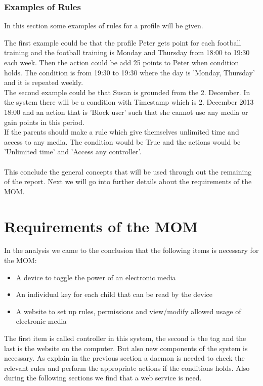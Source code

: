 \subsubsection{Examples of Rules}
In this section some examples of rules for a profile will be given.

The first example could be that the profile Peter gets point for each football training and the football training is Monday and Thursday from 18:00 to 19:30 each week. Then the action could be add 25 points to Peter when condition holds. The condition is from 19:30 to 19:30 where the day is 'Monday, Thursday' and it is repeated weekly. \\

The second example could be that Susan is grounded from the 2. December. In the system there will be a condition with Timestamp which is 2. December 2013 18:00
and an action that is 'Block user' such that she cannot use any media or gain points in this period. \\

If the parents should make a rule which give themselves unlimited time and access to any media. The condition would be True and the actions would be 'Unlimited time' and 'Access any controller'.\\\\

This conclude the general concepts that will be used through out the remaining of the report. Next we will go into further details about the requirements of the MOM.  


\section{Requirements of the MOM}
\label{sec:RequirMOM}

In the analysis we came to the conclusion that the following items is necessary for the MOM: 
\begin{itemize}
	\item A device to toggle the power of an electronic media
	\item An individual key for each child that can be read by the device
	\item A website to set up rules, permissions and view/modify allowed usage of electronic media
\end{itemize} 


The first item is called controller in this system, the second is the tag and the last is the website on the computer. But also new components of the system is necessary. As explain in the previous section a daemon is needed to check the relevant rules and perform the appropriate actions if the conditions holds. Also during the following sections we find that a web service is need. 

